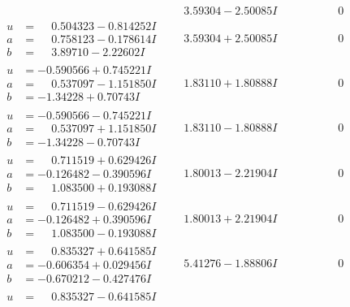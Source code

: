\documentclass[1p]{elsarticle_modified}
\theoremstyle{definition}
\begin{document}
$$\begin{array}{c|c|c}
 & \phantom{-}3.59304 - 2.50085 I & \phantom{-0.000000 } 0 \\ \hline\begin{aligned}
u &= \phantom{-}0.504323 - 0.814252 I \\
a &= \phantom{-}0.758123 - 0.178614 I \\
b &= \phantom{-}3.89710 - 2.22602 I\end{aligned}
 & \phantom{-}3.59304 + 2.50085 I & \phantom{-0.000000 } 0 \\ \hline\begin{aligned}
u &= -0.590566 + 0.745221 I \\
a &= \phantom{-}0.537097 - 1.151850 I \\
b &= -1.34228 + 0.70743 I\end{aligned}
 & \phantom{-}1.83110 + 1.80888 I & \phantom{-0.000000 } 0 \\ \hline\begin{aligned}
u &= -0.590566 - 0.745221 I \\
a &= \phantom{-}0.537097 + 1.151850 I \\
b &= -1.34228 - 0.70743 I\end{aligned}
 & \phantom{-}1.83110 - 1.80888 I & \phantom{-0.000000 } 0 \\ \hline\begin{aligned}
u &= \phantom{-}0.711519 + 0.629426 I \\
a &= -0.126482 - 0.390596 I \\
b &= \phantom{-}1.083500 + 0.193088 I\end{aligned}
 & \phantom{-}1.80013 - 2.21904 I & \phantom{-0.000000 } 0 \\ \hline\begin{aligned}
u &= \phantom{-}0.711519 - 0.629426 I \\
a &= -0.126482 + 0.390596 I \\
b &= \phantom{-}1.083500 - 0.193088 I\end{aligned}
 & \phantom{-}1.80013 + 2.21904 I & \phantom{-0.000000 } 0 \\ \hline\begin{aligned}
u &= \phantom{-}0.835327 + 0.641585 I \\
a &= -0.606354 + 0.029456 I \\
b &= -0.670212 - 0.427476 I\end{aligned}
 & \phantom{-}5.41276 - 1.88806 I & \phantom{-0.000000 } 0 \\ \hline\begin{aligned}
u &= \phantom{-}0.835327 - 0.641585 I \\

\end{aligned}
\end{array}$$
\end{document}
